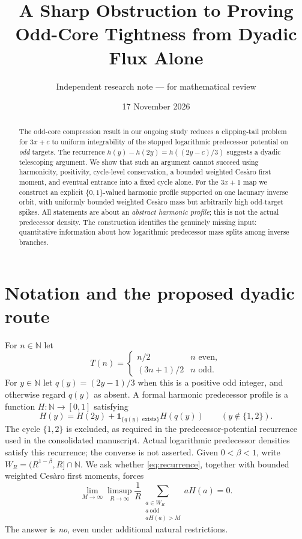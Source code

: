\documentclass[11pt,a4paper]{article}
\title{A Sharp Obstruction to Proving Odd-Core Tightness from Dyadic Flux Alone}
\author{Independent research note --- for mathematical review}
\date{17 November 2026}
\newcommand{\N}{\mathbb N}
\newcommand{\one}{\mathbf 1}
\begin{document}
\maketitle
\begin{abstract}
The odd-core compression result in our ongoing study reduces a clipping-tail
problem for $3x+c$ to uniform integrability of the stopped logarithmic
predecessor potential on \emph{odd} targets.  The recurrence
$h(y)-h(2y)=h((2y-c)/3)$ suggests a dyadic telescoping argument.
We show that such an argument cannot succeed using harmonicity,
positivity, cycle-level conservation, a bounded weighted Ces\`aro first
moment, and eventual entrance into a fixed cycle alone.  For the
$3x+1$ map we construct an explicit $\{0,1\}$-valued harmonic profile
supported on one lacunary inverse orbit, with uniformly bounded weighted
Ces\`aro mass but arbitrarily high odd-target spikes.  All statements
are about an \emph{abstract harmonic profile}; this is not the actual
predecessor density.  The construction identifies the genuinely missing
input: quantitative information about how logarithmic predecessor mass
splits among inverse branches.
\end{abstract}

\section{Notation and the proposed dyadic route}
For $n\in\N$ let
\[
 T(n)=\begin{cases}n/2&n\text{ even},\\(3n+1)/2&n\text{ odd}.
 \end{cases}
\]
For $y\in\N$ let $q(y)=(2y-1)/3$ when this is a positive odd integer,
and otherwise regard $q(y)$ as absent.  A formal harmonic predecessor
profile is a function $H:\N\to[0,1]$ satisfying
\begin{equation}\label{eq:recurrence}
 H(y)=H(2y)+\one_{\{q(y)\text{ exists}\}}H(q(y))
 \qquad(y\notin\{1,2\}).
\end{equation}
The cycle $\{1,2\}$ is excluded, as required in the predecessor-potential
recurrence used in the consolidated manuscript.  Actual logarithmic
predecessor densities satisfy this recurrence; the converse is not
asserted.  Given $0<\beta<1$, write $W_R=(R^{1-\beta},R]\cap\N$.
We ask whether \eqref{eq:recurrence}, together with bounded weighted
Ces\`aro first moments, forces
\begin{equation}\label{eq:odd-ui}
 \lim_{M\to\infty}\limsup_{R\to\infty}\frac1R
 \sum_{\substack{a\in W_R\\a\ \mathrm{odd}\\aH(a)>M}}aH(a)=0.
\end{equation}
The answer is \emph{no}, even under additional natural restrictions.
\end{document}
